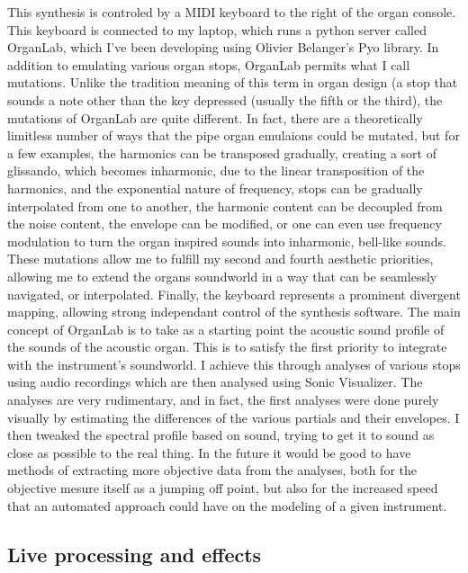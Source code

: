 \documentclass[12pt,twoside,maitrise]{dms_ks}
\theoremstyle{definition}
\begin{document}

This synthesis is controled by a MIDI keyboard to the right of the organ console. 
This keyboard is connected to my laptop, which runs a python server called OrganLab, which I've been developing using Olivier Belanger's Pyo library. 
In addition to emulating various organ stops, OrganLab permits what I call mutations. 
Unlike the tradition meaning of this term in organ design (a stop that sounds a note other than the key depressed (usually the fifth or the third), the mutations of OrganLab are quite different. 
In fact, there are a theoretically limitless number of ways that the pipe organ emulaions could be mutated, but for a few examples, the harmonics can be transposed gradually, creating a sort of glissando, which becomes inharmonic, due to the linear transposition of the harmonics, and the exponential nature of frequency, stops can be gradually interpolated from one to another, the harmonic content can be decoupled from the noise content, the envelope can be modified, or one can even use frequency modulation to turn the organ inspired sounds into inharmonic, bell-like sounds. 
These mutations allow me to fulfill my second and fourth aesthetic priorities, allowing me to extend the organs soundworld in a way that can be seamlessly navigated, or interpolated. 
Finally, the keyboard represents a prominent divergent mapping, allowing strong independant control of the synthesis software.  
The main concept of OrganLab is to take as a starting point the acoustic sound profile of the sounds of the acoustic organ. 
This is to satisfy the first priority to integrate with the instrument's soundworld. 
I achieve this through analyses of various stops using audio recordings which are then analysed using Sonic Visualizer. 
The analyses are very rudimentary, and in fact, the first analyses were done purely visually by estimating the differences of the various partials and their envelopes. 
I then tweaked the spectral profile based on sound, trying to get it to sound as close as possible to the real thing. 
In the future it would be good to have methods of extracting more objective data from the analyses, both for the objective mesure itself as a jumping off point, but also for the increased speed that an automated approach could have on the modeling of a given instrument.   

\subsection{Live processing and effects}
\end{document}
